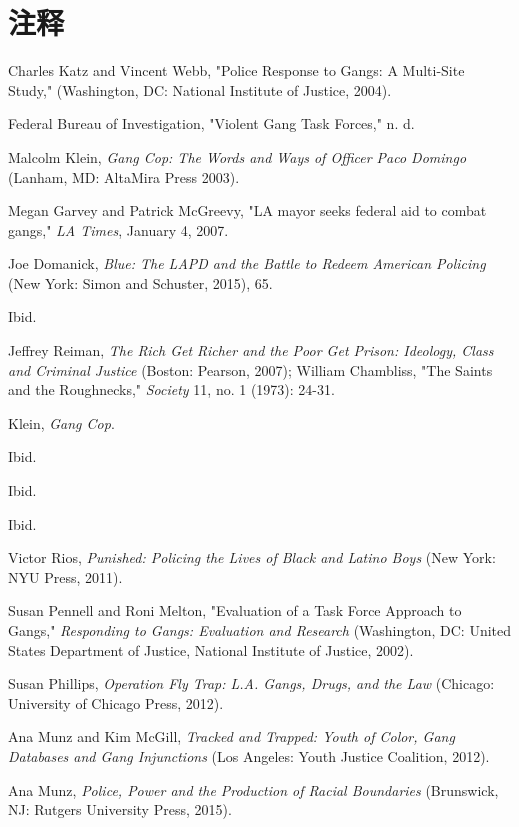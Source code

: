 \documentclass[fontset=fandol, a4paper, 12pt, openright]{ctexbook}
\begin{document}
\section*{注释}
\begin{enumerate}[label={[\arabic*]}]
    \item Charles Katz and Vincent Webb, "Police Response to Gangs: A Multi-Site Study," (Washington, DC: National Institute of Justice, 2004).
    \item Federal Bureau of Investigation, "Violent Gang Task Forces," n. d.
    \item Malcolm Klein, \textit{Gang Cop: The Words and Ways of Officer Paco Domingo} (Lanham, MD: AltaMira Press 2003).
    \item Megan Garvey and Patrick McGreevy, "LA mayor seeks federal aid to combat gangs," \textit{LA Times}, January 4, 2007.
    \item Joe Domanick, \textit{Blue: The LAPD and the Battle to Redeem American Policing} (New York: Simon and Schuster, 2015), 65.
    \item Ibid.
    \item Jeffrey Reiman, \textit{The Rich Get Richer and the Poor Get Prison: Ideology, Class and Criminal Justice} (Boston: Pearson, 2007); William Chambliss, "The Saints and the Roughnecks," \textit{Society} 11, no. 1 (1973): 24-31.
    \item Klein, \textit{Gang Cop}.
    \item Ibid.
    \item Ibid.
    \item Ibid.
    \item Victor Rios, \textit{Punished: Policing the Lives of Black and Latino Boys} (New York: NYU Press, 2011).
    \item Susan Pennell and Roni Melton, "Evaluation of a Task Force Approach to Gangs," \textit{Responding to Gangs: Evaluation and Research} (Washington, DC: United States Department of Justice, National Institute of Justice, 2002).
    \item Susan Phillips, \textit{Operation Fly Trap: L.A. Gangs, Drugs, and the Law} (Chicago: University of Chicago Press, 2012).
    \item Ana Munz and Kim McGill, \textit{Tracked and Trapped: Youth of Color, Gang Databases and Gang Injunctions} (Los Angeles: Youth Justice Coalition, 2012).
    \item Ana Munz, \textit{Police, Power and the Production of Racial Boundaries} (Brunswick, NJ: Rutgers University Press, 2015).

\end{enumerate}
\end{document}
